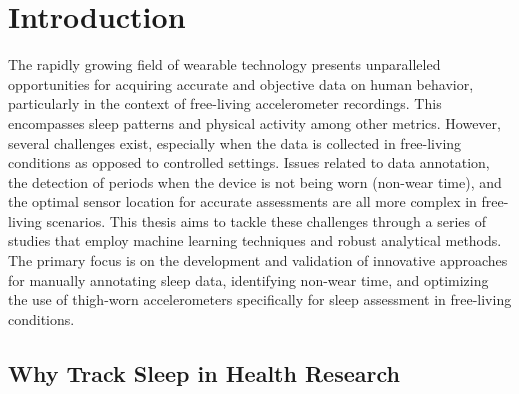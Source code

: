 \documentclass[
  9pt,
]{scrbook}
\begin{document}
\hypertarget{introduction}{%
\chapter{Introduction}\label{introduction}}

The rapidly growing field of wearable technology presents unparalleled
opportunities for acquiring accurate and objective data on human
behavior, particularly in the context of free-living accelerometer
recordings. This encompasses sleep patterns and physical activity among
other metrics. However, several challenges exist, especially when the
data is collected in free-living conditions as opposed to controlled
settings. Issues related to data annotation, the detection of periods
when the device is not being worn (non-wear time), and the optimal
sensor location for accurate assessments are all more complex in
free-living scenarios. This thesis aims to tackle these challenges
through a series of studies that employ machine learning techniques and
robust analytical methods. The primary focus is on the development and
validation of innovative approaches for manually annotating sleep data,
identifying non-wear time, and optimizing the use of thigh-worn
accelerometers specifically for sleep assessment in free-living
conditions.

\hypertarget{why-track-sleep-in-health-research}{%
\section{Why Track Sleep in Health
Research}\label{why-track-sleep-in-health-research}}
\end{document}
